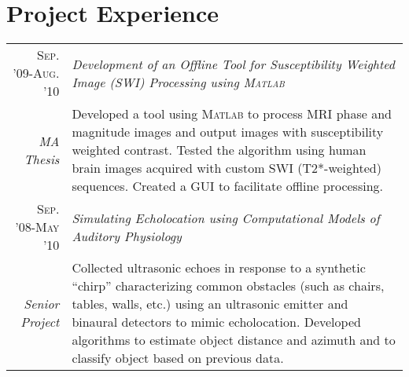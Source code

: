 \documentclass[letterpaper,11pt]{article}
\newcommand{\amper}{{\fontspec[Scale=.95]{Hoefler Text}\selectfont\itshape\&}}
\begin{document}
\vspace{-0.2cm}
\section{Project Experience}
\begin{tabular}{r|p{14.5cm}}
\textsc{Sep. '09-Aug. '10} & \small{\emph{Development of an Offline Tool for Susceptibility Weighted Image (SWI) Processing using \textsc{Matlab}}} \\
\textsl{MA Thesis} & \footnotesize{Developed a tool using \textsc{Matlab} to process MRI phase and magnitude images and output images with susceptibility weighted contrast. Tested the algorithm using human brain images acquired with custom SWI (T2*-weighted) sequences. Created a GUI to facilitate offline processing.}\\
\textsc{Sep. '08-May '10} & \small{\emph{Simulating Echolocation using Computational Models of Auditory Physiology}} \\
\textsl{Senior Project} & \footnotesize{Collected ultrasonic echoes in response to a synthetic ``chirp'' characterizing common obstacles (such as chairs, tables, walls, etc.) using an ultrasonic emitter and binaural detectors to mimic echolocation. Developed algorithms to estimate object distance and azimuth and to classify object based on previous data.}
\end{tabular}



\vspace{-0.3cm}
\end{document}
